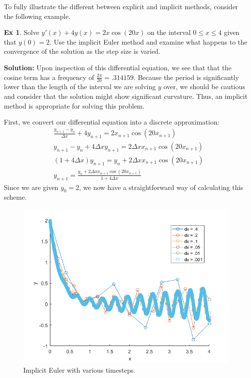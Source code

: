 \documentclass[]{article}
\theoremstyle{definition}
\newtheorem{exmp}{Ex}[section]
\numberwithin{equation}{section}
\begin{document}
	To fully illustrate the different between explicit and implicit methods, consider the following example.
	\begin{exmp}
		Solve $y'(x) + 4y(x) = 2x\cos(20x)$ on the interval $ 0 \leq x \leq 4 $ given that $y(0) = 2$. Use the implicit Euler method and examine what happens to the convergence of the solution as the step size is varied.
	\end{exmp}
	\textbf{Solution:} Upon inspection of this differential equation, we see that that the cosine term has a frequency of $\frac{2\pi}{20} =  .314159$. Because the period is significantly lower than the length of the interval we are solving $y$ over, we should be cautious and consider that the solution might show significant curvature. Thus, an implicit method is appropriate for solving this problem.
	
	First, we convert our differential equation into a discrete approximation:
	\begin{align*}
			&\frac{y_{n+1} - y_n}{\Delta x} + 4 y_{n+1} = 2 x_{n+1} \cos(20x_{n+1}) \\
			&y_{n+1} - y_n + 4 \Delta x y_{n+1} = 2\Delta x x_{n+1} \cos(20x_{n+1}) \\
			&(1 + 4\Delta x) y_{n+1} = y_n + 2\Delta x x_{n+1} \cos(20x_{n+1})\\
			&y_{n+1} = \frac{y_n + 2\Delta x x_{n+1} \cos(20x_{n+1})}{1 + 4\Delta x}
	\end{align*}
	Since we are given $y_0 = 2$, we now have a straightforward way of calculating this scheme.
		\begin{center}
		\begin{figure}[H]
			\includegraphics[scale=.75]{ex3_fig.png} 
			\caption{Implicit Euler with various timesteps.}
			\label{fig:implic1}
		\end{figure}
	\end{center}
\end{document}

